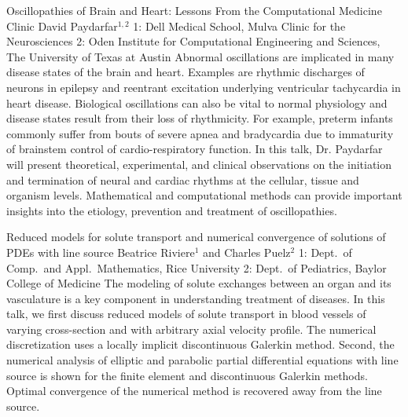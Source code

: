 \vspace{1.5ex}
\abs
{Oscillopathies of Brain and Heart: Lessons From the Computational Medicine Clinic}
{David Paydarfar$^{1,2}$}
{1: Dell Medical School, Mulva Clinic for the Neurosciences 2: Oden Institute for Computational Engineering and Sciences,
The University of Texas at Austin}
{Abnormal oscillations are implicated in many disease states of the brain and heart. Examples are rhythmic discharges of neurons in epilepsy and reentrant excitation underlying ventricular tachycardia in heart disease. Biological oscillations can also be vital to normal physiology and disease states result from their loss of rhythmicity. For example, preterm infants commonly suffer from bouts of severe apnea and bradycardia due to immaturity of brainstem control of cardio-respiratory function. In this talk, Dr. Paydarfar will present theoretical, experimental, and clinical observations on the initiation and termination of neural and cardiac rhythms at the cellular, tissue and organism levels. Mathematical and computational methods can provide important insights into the etiology, prevention and treatment of oscillopathies.}


\vspace{1.5ex}
\abs
{Reduced models for solute transport and numerical convergence of solutions of PDEs with line source}
{Beatrice Riviere$^{1}$ and Charles Puelz$^{2}$}
{1: Dept.~of Comp.~and Appl.~Mathematics, Rice University 2: Dept.~of Pediatrics, Baylor College of Medicine}
{The modeling of solute exchanges between an organ and its vasculature is a key component  in understanding
treatment of diseases. In this talk, we first discuss reduced models of solute transport in blood vessels of
varying cross-section and with arbitrary axial velocity profile.  The numerical discretization uses a locally
implicit discontinuous Galerkin method. Second, the numerical analysis of elliptic and parabolic partial differential equations
with line source is shown for the finite element and discontinuous Galerkin methods. Optimal convergence of the numerical
method is recovered away from the line source.}


